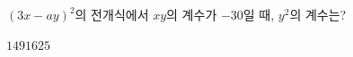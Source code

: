$(3x-ay)^2$의 전개식에서 $xy$의 계수가 $-30$일 때, $y^2$의 계수는? 
\begin{choices32}{$1$}{$4$}{$9$}{$16$}{$25$}\end{choices32}
